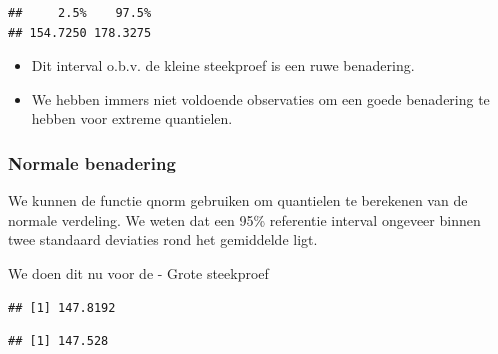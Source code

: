 \documentclass[
  12pt,dutch]{book}
\newenvironment{Shaded}{\begin{snugshade}}{\end{snugshade}}
\newcommand{\AttributeTok}[1]{\textcolor[rgb]{0.13,0.29,0.53}{#1}}
\newcommand{\DecValTok}[1]{\textcolor[rgb]{0.00,0.00,0.81}{#1}}
\newcommand{\FloatTok}[1]{\textcolor[rgb]{0.00,0.00,0.81}{#1}}
\newcommand{\FunctionTok}[1]{\textcolor[rgb]{0.13,0.29,0.53}{\textbf{#1}}}
\newcommand{\NormalTok}[1]{#1}
\newcommand{\SpecialCharTok}[1]{\textcolor[rgb]{0.81,0.36,0.00}{\textbf{#1}}}
\providecommand{\tightlist}{%
  \setlength{\itemsep}{0pt}\setlength{\parskip}{0pt}}
\theoremstyle{definition}
\theoremstyle{definition}
\theoremstyle{definition}
\theoremstyle{definition}
\theoremstyle{remark}
\begin{document}
\begin{verbatim}
##     2.5%    97.5% 
## 154.7250 178.3275
\end{verbatim}

\begin{itemize}
\tightlist
\item
  Dit interval o.b.v. de kleine steekproef is een ruwe benadering.
\item
  We hebben immers niet voldoende observaties om een goede benadering te hebben voor extreme quantielen.
\end{itemize}

\subsubsection{Normale benadering}\label{normale-benadering-1}

We kunnen de functie qnorm gebruiken om quantielen te berekenen van de normale verdeling. We weten dat een 95\% referentie interval ongeveer binnen twee standaard deviaties rond het gemiddelde ligt.

We doen dit nu voor de
- Grote steekproef

\begin{Shaded}
\end{Shaded}

\begin{verbatim}
## [1] 147.8192
\end{verbatim}

\begin{Shaded}
\end{Shaded}

\begin{verbatim}
## [1] 147.528
\end{verbatim}

\begin{Shaded}
\end{Shaded}
\end{document}
